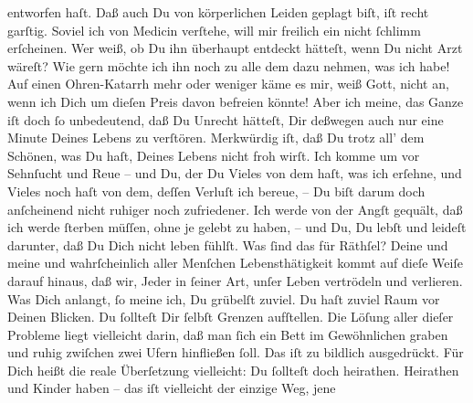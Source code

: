 \begin{ledgroupsized}[t]{13cm}
               entworfen haſt. Daß auch Du von körperlichen Leiden geplagt biſt, iſt recht garſtig.
               Soviel ich von Medicin verſtehe, will mir freilich ein \label{K_L02792-12v}\label{K_L02792-12h} nicht ſchlimm erſcheinen. Wer weiß, ob Du ihn
               überhaupt entdeckt hätteſt, {\pb}wenn Du nicht Arzt
               wäreſt? Wie gern möchte ich ihn noch zu alle dem dazu nehmen, was ich habe! Auf einen
               Ohren-Katarrh mehr oder weniger käme es mir, weiß Gott, nicht an, wenn ich Dich \strikeout{\textcolor{gray}{von}} um dieſen Preis davon befreien könnte! Aber ich meine, das Ganze iſt doch ſo
               unbedeutend, daß Du Unrecht hätteſt, Dir deßwegen auch nur eine Minute Deines Lebens
               zu verſtören.\pend
           \pstart
           Merkwürdig iſt, daß Du trotz all’ dem Schönen, was Du haſt, Deines Lebens nicht froh
               wirſt. Ich komme um vor Sehnſucht und Reue – und Du, der Du Vieles von dem haſt, was
               ich erſehne, und Vieles noch haſt von dem, deſſen Verluſt ich bereue, – Du biſt darum
               doch {\pb}anſcheinend nicht ruhiger noch zufriedener.
               Ich werde von der Angſt gequält, daß ich werde ſterben müſſen, ohne je gelebt zu
               haben, – und Du, Du lebſt und leideſt darunter, daß Du Dich nicht leben fühlſt. Was
               ſind das für Räthſel? Deine und meine und 
               wahrſcheinlich aller Menſchen Lebensthätigkeit kommt auf dieſe Weiſe darauf hinaus,
               daß wir, Jeder in ſeiner Art, unſer Leben vertrödeln und verlieren. Was Dich anlangt,
               ſo meine ich, Du grübelſt zuviel. Du haſt zuviel Raum vor Deinen Blicken. \strikeout{\textcolor{gray}{×}} Du ſollteſt Dir ſelbſt Grenzen aufſtellen. Die Löſung aller dieſer Probleme
                  {\pb}liegt vielleicht darin, daß man ſich ein Bett im
               Gewöhnlichen graben und ruhig zwiſchen zwei Ufern hinfließen ſoll. Das iſt zu
               bildlich ausgedrückt. Für Dich heißt die reale Überſetzung vielleicht: Du ſollteſt
               doch heirathen. Heirathen und Kinder haben – das iſt vielleicht der einzige Weg, jene

\end{ledgroupsized}
